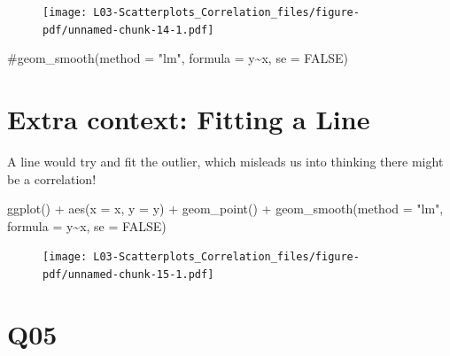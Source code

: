 \documentclass[
  letterpaper,
  DIV=11,
  numbers=noendperiod]{scrreprt}
\newenvironment{Shaded}{\begin{snugshade}}{\end{snugshade}}
\newcommand{\AttributeTok}[1]{\textcolor[rgb]{0.40,0.45,0.13}{#1}}
\newcommand{\CommentTok}[1]{\textcolor[rgb]{0.37,0.37,0.37}{#1}}
\newcommand{\ConstantTok}[1]{\textcolor[rgb]{0.56,0.35,0.01}{#1}}
\newcommand{\FunctionTok}[1]{\textcolor[rgb]{0.28,0.35,0.67}{#1}}
\newcommand{\NormalTok}[1]{\textcolor[rgb]{0.00,0.23,0.31}{#1}}
\newcommand{\SpecialCharTok}[1]{\textcolor[rgb]{0.37,0.37,0.37}{#1}}
\newcommand{\StringTok}[1]{\textcolor[rgb]{0.13,0.47,0.30}{#1}}
\begin{document}
\begin{figure}[H]

{\centering \texttt{[image: L03-Scatterplots\_Correlation\_files/figure-pdf/unnamed-chunk-14-1.pdf]}

}

\end{figure}

\begin{Shaded}
\begin{Highlighting}[]
    \CommentTok{\#geom\_smooth(method = "lm", formula = y\textasciitilde{}x, se = FALSE)}
\end{Highlighting}
\end{Shaded}

\hypertarget{extra-context-fitting-a-line}{%
\section{Extra context: Fitting a
Line}\label{extra-context-fitting-a-line}}

\vspace{1cm}

A line would try and fit the outlier, which misleads us into thinking
there might be a correlation!

\begin{Shaded}
\begin{Highlighting}[]
\FunctionTok{ggplot}\NormalTok{() }\SpecialCharTok{+} \FunctionTok{aes}\NormalTok{(}\AttributeTok{x =}\NormalTok{ x, }\AttributeTok{y =}\NormalTok{ y) }\SpecialCharTok{+} \FunctionTok{geom\_point}\NormalTok{() }\SpecialCharTok{+} 
    \FunctionTok{geom\_smooth}\NormalTok{(}\AttributeTok{method =} \StringTok{"lm"}\NormalTok{, }\AttributeTok{formula =}\NormalTok{ y}\SpecialCharTok{\textasciitilde{}}\NormalTok{x, }\AttributeTok{se =} \ConstantTok{FALSE}\NormalTok{)}
\end{Highlighting}
\end{Shaded}

\begin{figure}[H]

{\centering \texttt{[image: L03-Scatterplots\_Correlation\_files/figure-pdf/unnamed-chunk-15-1.pdf]}

}

\end{figure}

\hypertarget{q05}{%
\section{Q05}\label{q05}}
\end{document}
